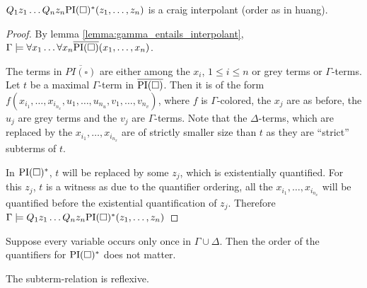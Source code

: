 \begin{thm}
	$Q_1 z_1 \ldots Q_n z_n \mathrm{PI}(\square)^*(z_1, \ldots, z_n)$ is a craig interpolant (order as in huang).
\end{thm}
\begin{proof}
	By lemma \ref{lemma:gamma_entails_interpolant}, $\Gamma \models \forall x_1 \ldots \forall x_n \overline{\mathrm{PI}(\square)}(x_1, \ldots, x_n)$.

	The terms in $\overline{PI(\square)}$ are either among the $x_i$, $1 \leq i \leq n$ or grey terms or $\Gamma$-terms.
	Let $t$ be a maximal $\Gamma$-term in $\overline{\mathrm{PI}(\square)}$.
	Then it is of the form $f(x_{i_1}, \ldots, x_{i_{n_x}}, u_1, \ldots, u_{n_u}, v_1, \ldots, v_{n_v})$, where $f$ is $\Gamma$-colored, the $x_j$ are as before, the $u_j$ are grey terms and the $v_j$ are $\Gamma$-terms.
	Note that the $\Delta$-terms, which are replaced by the $x_{i_1}, \ldots, x_{i_{n_x}}$ are of strictly smaller size than $t$ as they are ``strict'' subterms of $t$.

	In $\mathrm{PI}(\square)^*$, $t$ will be replaced by some $z_j$, which is existentially quantified.
	For this $z_j$, $t$ is a witness as due to the quantifier ordering, all the $x_{i_1}, \ldots, x_{i_{n_x}}$ will be quantified before the existential quantification of $z_j$.
	Therefore $\Gamma \models Q_1 z_1 \ldots Q_n z_n \mathrm{PI}(\square)^*(z_1, \ldots, z_n)$

\end{proof}




\begin{conj}
	Suppose every variable occurs only once in $\Gamma \cup \Delta$.
	Then the order of the quantifiers for $\mathrm{PI}(\square)^*$ does not matter.
\end{conj}

%

The subterm-relation is reflexive.

